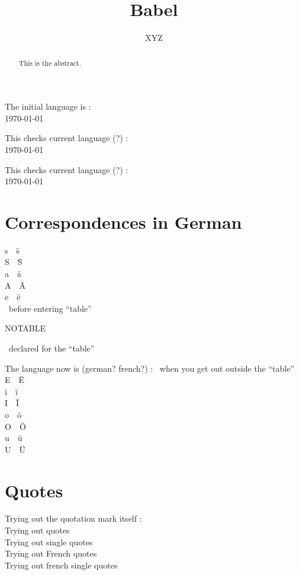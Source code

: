 \documentclass{article}
\title{Babel}
\author{XYZ}
\begin{document}
The initial language is : 
\\
\today\\
\newcommand{\DQ}[1]{\dq#1~~\"#1}

\maketitle

This checks current language (?) : %
{}\\
\today\\
\tableofcontents

This checks current language (?) : %
{}\\
\today\\
\begin{abstract}
This is the abstract.
\end{abstract}

\section{Correspondences in German}
\DQ{s}\\
\DQ{S}\\
\DQ{a}\\
\DQ{A}\\
\DQ{e}\\
~before entering ``table''
\begin{table}
\caption{NOTABLE}
~declared for the ``table''
\end{table}
The language now is (german? french?) : 
~when you get out outside the ``table''\\
\DQ{E}\\
\DQ{i}\\
\DQ{I}\\
\DQ{o}\\
\DQ{O}\\
\DQ{u}\\
\DQ{U}

\section{Quotes}
\noindent
Trying out the quotation mark itself : \dq\\
\glqq Trying out quotes \grqq\\
\glq Trying out single quotes \grq\\
\flqq Trying out French quotes \frqq\\
\flq Trying out french single quotes \frq\\
\end{document}

